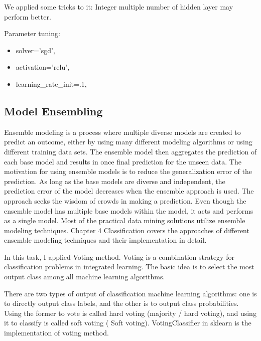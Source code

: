 \documentclass[11pt,en]{elegantpaper}
\begin{document}
We applied some tricks to it: Integer multiple number of hidden layer may perform better.

Parameter tuning:
\begin{itemize}
	\item solver='sgd', 
    \item activation='relu',
    \item learning\_rate\_init=.1,
\end{itemize}

\subsection{Model Ensembling}
Ensemble modeling is a process where multiple diverse models are created to predict an outcome, either by using many different modeling algorithms or using different training data sets. The ensemble model then aggregates the prediction of each base model and results in once final prediction for the unseen data. The motivation for using ensemble models is to reduce the generalization error of the prediction. As long as the base models are diverse and independent, the prediction error of the model decreases when the ensemble approach is used. The approach seeks the wisdom of crowds in making a prediction. Even though the ensemble model has multiple base models within the model, it acts and performs as a single model. Most of the practical data mining solutions utilize ensemble modeling techniques. Chapter 4 Classification covers the approaches of different ensemble modeling techniques and their implementation in detail.

In this task, I applied Voting method. Voting is a combination strategy for classification problems in integrated learning. The basic idea is to select the most output class among all machine learning algorithms.

There are two types of output of classification machine learning algorithms: one is to directly output class labels, and the other is to output class probabilities. Using the former to vote is called hard voting (majority / hard voting), and using it to classify is called soft voting ( Soft voting). VotingClassifier in sklearn is the implementation of voting method.
\end{document}

